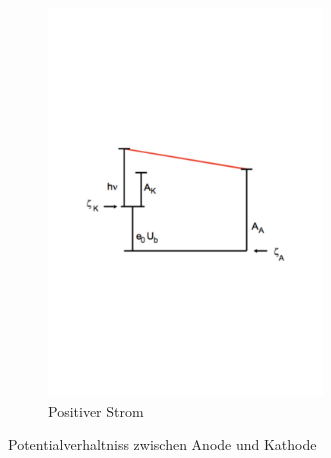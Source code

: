 \begin{figure}
\begin{subfigure}{0.48\textwidth}
  \includegraphics[width=0.8\textwidth]{500-7.pdf}
  \caption{Positiver Strom \cite{1}}
  \label{fig:500-7}
 \end{subfigure}
 \caption{Potentialverhaltniss zwischen Anode und Kathode}
 \label{fig:500-6-7}
\end{figure}
